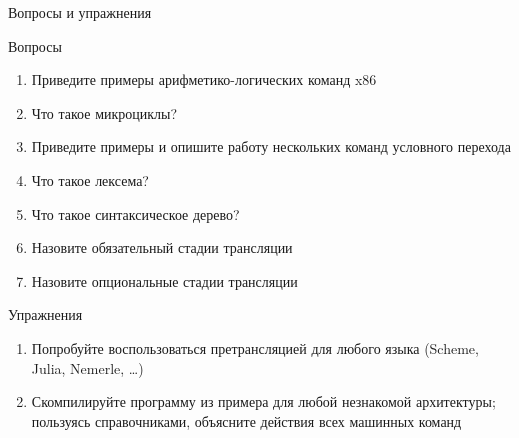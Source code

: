 \documentclass[xetex,aspectratio=43]{beamer}
\begin{document}
\begin{frame}{Вопросы и упражнения}
    \begin{block}{Вопросы}
        \protect\hypertarget{ux432ux43eux43fux440ux43eux441ux44b}{}
        \begin{enumerate}
            \tightlist
            \item
            Приведите примеры арифметико-логических команд x86
            \item
            Что такое микроциклы?
            \item
            Приведите примеры и опишите работу нескольких команд условного
            перехода
            \item
            Что такое лексема?
            \item
            Что такое синтаксическое дерево?
            \item
            Назовите обязательный стадии трансляции
            \item
            Назовите опциональные стадии трансляции
        \end{enumerate}
    \end{block}

    \begin{block}{Упражнения}
        \protect\hypertarget{ux443ux43fux440ux430ux436ux43dux435ux43dux438ux44f}{}
        \begin{enumerate}
            \tightlist
            \item
            Попробуйте воспользоваться претрансляцией для любого языка (Scheme,
            Julia, Nemerle, \ldots)
            \item
            Скомпилируйте программу из примера для любой незнакомой архитектуры;
            пользуясь справочниками, объясните действия всех машинных команд
        \end{enumerate}
    \end{block}
\end{frame}

\postamble
\end{document}
